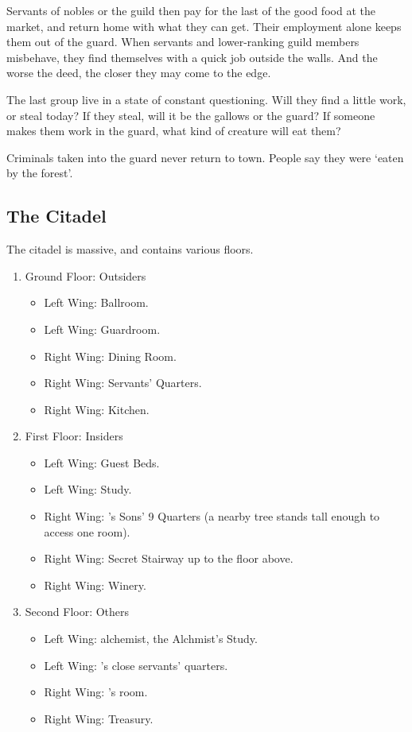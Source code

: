 \begin{multicols}{2}
Servants of nobles or the guild then pay for the last of the good food at the market, and return home with what they can get.
Their employment alone keeps them out of the \gls{guard}.
When servants and lower-ranking guild members misbehave, they find themselves with a quick job outside the walls.
And the worse the deed, the closer they may come to the \gls{edge}.

The last group live in a state of constant questioning.
Will they find a little work, or steal today?
If they steal, will it be the gallows or the guard?
If someone makes them work in the \gls{guard}, what kind of creature will eat them?

Criminals taken into the \gls{guard} never return to \gls{town}.
People say they were `eaten by the forest'.

\subsection{The Citadel}\label{citadel}

The citadel is massive, and contains various floors.

\begin{enumerate}

  \item{Ground Floor: Outsiders}
    \begin{itemize}
      \item{Left Wing: Ballroom.}
      \item{Left Wing: Guardroom.}
      \item{Right Wing: Dining Room.}
      \item{Right Wing: Servants' Quarters.}
      \item{Right Wing: Kitchen.}
    \end{itemize}
  \item{First Floor: Insiders}
    \begin{itemize}
      \item{Left Wing: Guest Beds.}
      \item{Left Wing: Study.}
      \item{Right Wing: 's Sons' 9 Quarters (a nearby tree stands tall enough to access one room).}
      \item{Right Wing: Secret Stairway up to the floor above.}
      \item{Right Wing: Winery.}
    \end{itemize}

  \item{Second Floor: Others}
    \begin{itemize}
      \item{Left Wing: \gls{alchemist}, the Alchmist's Study.}
      \item{Left Wing: 's close servants' quarters.}
      \item{Right Wing: 's room.}
      \item{Right Wing: Treasury.}
    \end{itemize}


\end{enumerate}
\end{multicols}

